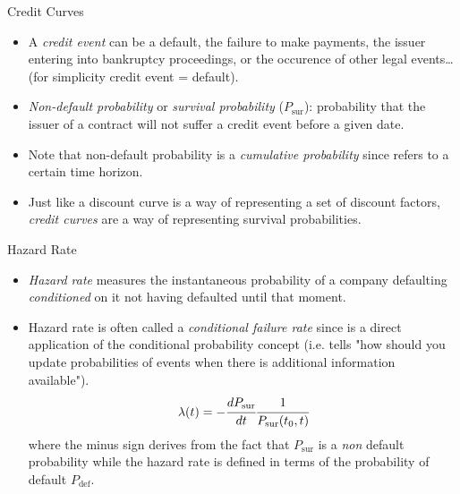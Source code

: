 \documentclass{beamer}
\begin{document}
\begin{frame}{Credit Curves}
\begin{itemize}
    \item A \emph{credit event} can be a default, the failure to make payments, the issuer entering into bankruptcy proceedings, or the occurence of other legal events\dots (for simplicity credit event = default).
    \item \emph{Non-default probability} or \emph{survival probability} ($P_{\textrm{sur}}$): probability that the issuer of a contract will not suffer a credit event before a given date. 
    \item Note that non-default probability is a \emph{cumulative probability} since refers to a certain time horizon. 
    \item Just like a discount curve is a way of representing a set of discount factors, \emph{credit curves} are a way of representing survival probabilities.
\end{itemize}
\end{frame}

\begin{frame}{Hazard Rate}
	\begin{itemize}
		\item \emph{Hazard rate} measures the instantaneous probability of a company defaulting \emph{conditioned} on it not having defaulted until that moment.
		\item Hazard rate is often called a \emph{conditional failure rate} since is a direct application of the conditional probability concept (i.e. tells "how should you update probabilities of events when there is additional information available"). 
		\begin{equation*}
		\lambda(t) = -\cfrac{dP_{\textrm{sur}}}{dt}\cfrac{1}{P_{\textrm{sur}}(t_0, t)}
		\end{equation*}
		where the minus sign derives from the fact that $P_{\textrm{sur}}$ is a \emph{non} default probability while the hazard rate is defined in terms of the probability of default $P_{\textrm{def}}$.
	\end{itemize}
\end{frame}
\end{document}
